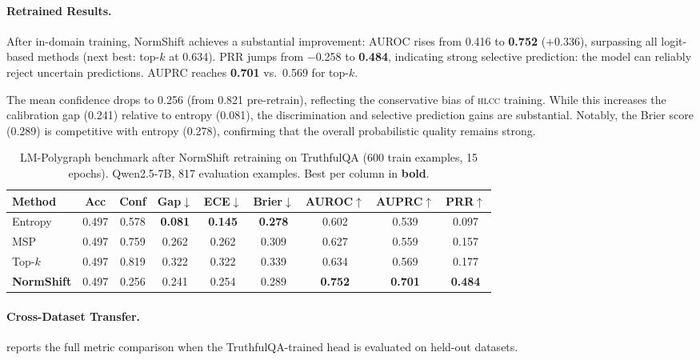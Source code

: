\documentclass[11pt,a4paper]{article}
\newcommand{\hlcc}{\textsc{hlcc}}
\begin{document}
\paragraph{Retrained Results.}
After in-domain training, NormShift achieves a substantial improvement:
AUROC rises from 0.416 to \textbf{0.752} ($+$0.336), surpassing all
logit-based methods (next best: top-$k$ at 0.634).  PRR jumps from
$-$0.258 to \textbf{0.484}, indicating strong selective prediction: the
model can reliably reject uncertain predictions.  AUPRC reaches
\textbf{0.701} vs.\ 0.569 for top-$k$.

The mean confidence drops to 0.256 (from 0.821 pre-retrain), reflecting
the conservative bias of \hlcc{} training.  While this increases the
calibration gap (0.241) relative to entropy (0.081), the discrimination
and selective prediction gains are substantial.  Notably, the Brier
score (0.289) is competitive with entropy (0.278), confirming that the
overall probabilistic quality remains strong.

\begin{table}[H]
\centering
\caption{LM-Polygraph benchmark after NormShift retraining on TruthfulQA
         (600 train examples, 15 epochs).
         Qwen2.5-7B, 817 evaluation examples.
         Best per column in \textbf{bold}.}
\label{tab:polygraph-retrained}
\small
\begin{tabular}{@{}lcccccccc@{}}
\toprule
Method & Acc & Conf & Gap$\downarrow$ & ECE$\downarrow$ & Brier$\downarrow$
       & AUROC$\uparrow$ & AUPRC$\uparrow$ & PRR$\uparrow$ \\
\midrule
Entropy      & 0.497 & 0.578 & \textbf{0.081} & \textbf{0.145} & \textbf{0.278}
             & 0.602 & 0.539 & 0.097 \\
MSP          & 0.497 & 0.759 & 0.262 & 0.262 & 0.309
             & 0.627 & 0.559 & 0.157 \\
Top-$k$      & 0.497 & 0.819 & 0.322 & 0.322 & 0.339
             & 0.634 & 0.569 & 0.177 \\
\textbf{NormShift} & 0.497 & 0.256 & 0.241 & 0.254 & 0.289
             & \textbf{0.752} & \textbf{0.701} & \textbf{0.484} \\
\bottomrule
\end{tabular}
\end{table}

\paragraph{Cross-Dataset Transfer.}
 reports the full metric comparison when
the TruthfulQA-trained head is evaluated on held-out datasets.
\end{document}
